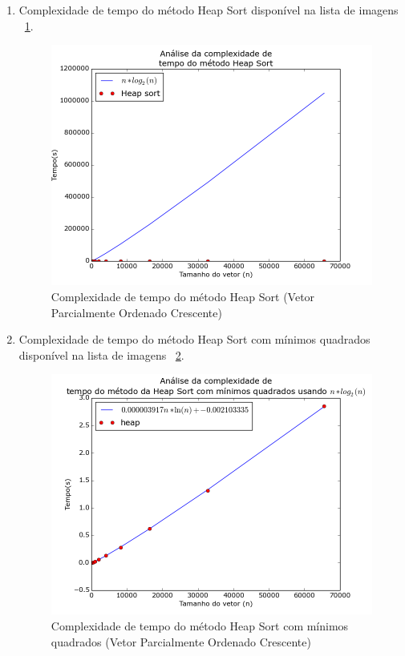 \documentclass[12pt,a4paper,twoside]{report}
\begin{document}
\begin{enumerate}
\begin{enumerate}
								
								\item Complexidade de tempo do método Heap Sort disponível na lista de imagens ~\ref{fig:HeapPlot2POC}.
								\begin{figure}[!h]
									\centering
									\includegraphics[scale=0.6]{../imagens/Heap/heap_plot_2_parcialmente_ordenado_crescente.png}
									\caption{Complexidade de tempo do método Heap Sort (Vetor Parcialmente Ordenado Crescente) \label{fig:HeapPlot2POC}}
								\end{figure}
								
								
								\item Complexidade de tempo do método Heap Sort com mínimos quadrados disponível na lista de imagens  ~\ref{fig:HeapPlot3POC}.
								\begin{figure}[!h]
									\centering
									\includegraphics[scale=0.6]{../imagens/Heap/heap_plot_3_parcialmente_ordenado_crescente.png}
									\caption{Complexidade de tempo do método Heap Sort com mínimos quadrados (Vetor Parcialmente Ordenado Crescente) \label{fig:HeapPlot3POC}}
								\end{figure}
							

\end{enumerate}
\end{enumerate}
\end{document}
